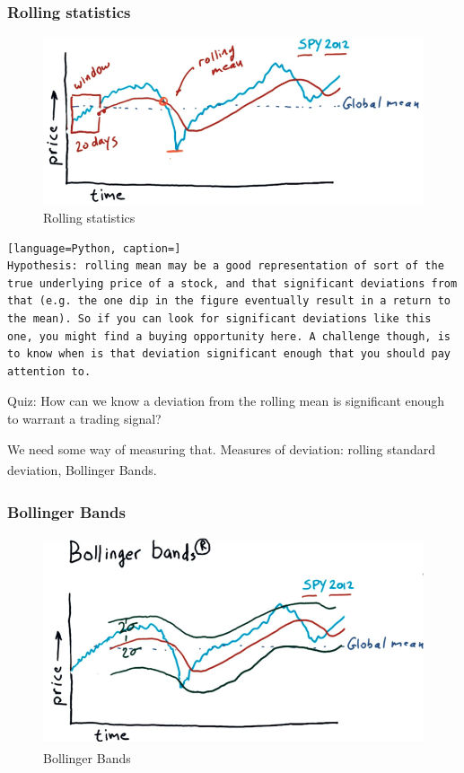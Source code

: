\documentclass[12pt]{article}
\begin{document}
\subsubsection{Rolling statistics}
\begin{figure}[!ht]
\centering
\includegraphics[scale=0.45]{fig/fig10}
\caption{Rolling statistics}
\end{figure}

\begin{lstlisting}[language=Python, caption=]
Hypothesis: rolling mean may be a good representation of sort of the true underlying price of a stock, and that significant deviations from that (e.g. the one dip in the figure eventually result in a return to the mean). So if you can look for significant deviations like this one, you might find a buying opportunity here. A challenge though, is to know when is that deviation significant enough that you should pay attention to. 
\end{lstlisting}

Quiz: How can we know a deviation from the rolling mean is significant enough to warrant a trading signal?

We need some way of measuring that. Measures of deviation: rolling standard deviation, Bollinger Bands\textsuperscript\textregistered.

\subsubsection{Bollinger Bands\textsuperscript\textregistered}
\begin{figure}[!ht]
\centering
\includegraphics[scale=0.45]{fig/fig11}
\caption{Bollinger Bands\textsuperscript\textregistered}
\end{figure}
\end{document}
